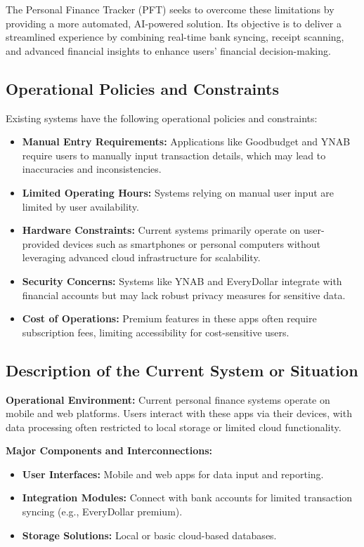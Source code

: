 The Personal Finance Tracker (PFT) seeks to overcome these limitations by providing a more automated, AI-powered solution. Its objective is to deliver a streamlined experience by combining real-time bank syncing, receipt scanning, and advanced financial insights to enhance users’ financial decision-making.

\subsection{Operational Policies and Constraints}
Existing systems have the following operational policies and constraints:
\begin{itemize}
    \item \textbf{Manual Entry Requirements:} Applications like Goodbudget and YNAB require users to manually input transaction details, which may lead to inaccuracies and inconsistencies.
    \item \textbf{Limited Operating Hours:} Systems relying on manual user input are limited by user availability.
    \item \textbf{Hardware Constraints:} Current systems primarily operate on user-provided devices such as smartphones or personal computers without leveraging advanced cloud infrastructure for scalability.
    \item \textbf{Security Concerns:} Systems like YNAB and EveryDollar integrate with financial accounts but may lack robust privacy measures for sensitive data.
    \item \textbf{Cost of Operations:} Premium features in these apps often require subscription fees, limiting accessibility for cost-sensitive users.
\end{itemize}

\subsection{Description of the Current System or Situation}

\textbf{Operational Environment:} Current personal finance systems operate on mobile and web platforms. Users interact with these apps via their devices, with data processing often restricted to local storage or limited cloud functionality.

\textbf{Major Components and Interconnections:}
\begin{itemize}
    \item \textbf{User Interfaces:} Mobile and web apps for data input and reporting.
    \item \textbf{Integration Modules:} Connect with bank accounts for limited transaction syncing (e.g., EveryDollar premium).
    \item \textbf{Storage Solutions:} Local or basic cloud-based databases.
\end{itemize}


